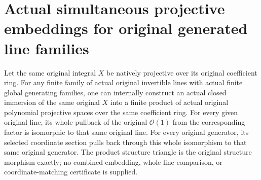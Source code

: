 \section{Actual simultaneous projective embeddings for original generated line families}
\label{sec:generated-line-family-projective-embedding}

\begin{theorem}
\label{thm:generated-line-family-projective-embedding}
\leanok
{}
Let the same original integral $X$ be natively projective over its
original coefficient ring. For any finite family of actual
original invertible lines with actual finite global generating
families, one can internally construct an actual closed immersion
of the same original $X$ into a finite product of actual original
polynomial projective spaces over the same coefficient ring.
For every given original line, its whole pullback of the original
$\mathcal O(1)$ from the corresponding factor is isomorphic to that
same original line. For every original generator, its selected
coordinate section pulls back through this whole isomorphism to
that same original generator. The product structure triangle is the original
structure morphism exactly; no combined embedding, whole line
comparison, or coordinate-matching certificate is supplied.
\end{theorem}

